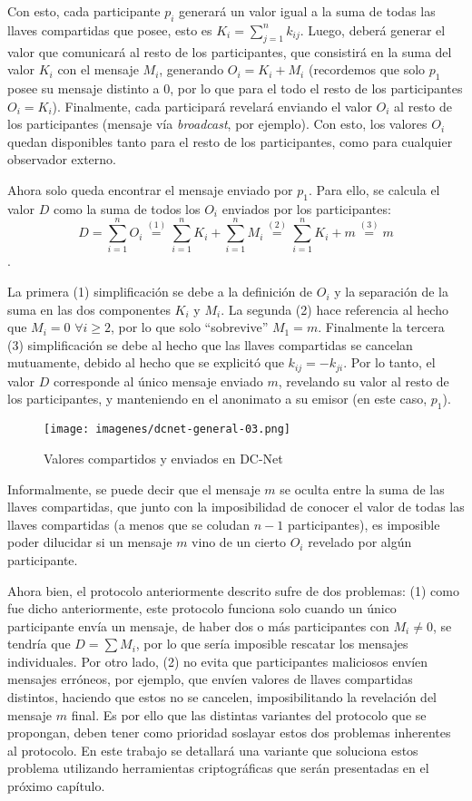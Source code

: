 Con esto, cada participante $p_i$ generará un valor igual a la suma de todas las llaves compartidas que posee, esto es $K_i = \sum_{j=1}^n k_{ij}$. Luego, deberá generar el valor que comunicará al resto de los participantes, que consistirá en la suma del valor $K_i$ con el mensaje $M_i$, generando $O_i = K_i + M_i$ (recordemos que solo $p_1$ posee su mensaje distinto a 0, por lo que para el todo el resto de los participantes $O_i = K_i$). Finalmente, cada participará revelará enviando el valor $O_i$ al resto de los participantes (mensaje vía \emph{broadcast}, por ejemplo). Con esto, los valores $O_i$ quedan disponibles tanto para el resto de los participantes, como para cualquier observador externo.

Ahora solo queda encontrar el mensaje enviado por $p_1$. Para ello, se calcula el valor $D$ como la suma de todos los $O_i$ enviados por los participantes: $$D = \sum_{i=1}^n O_i \overset{(1)}{=} \sum_{i=1}^n K_i + \sum_{i=1}^n M_i \overset{(2)}{=} \sum_{i=1}^n K_i + m \overset{(3)}{=} m$$.

La primera (1) simplificación se debe a la definición de $O_i$ y la separación de la suma en las dos componentes $K_i$ y $M_i$. La segunda (2) hace referencia al hecho que $M_i = 0$ $\forall i \geq 2$, por lo que solo ``sobrevive'' $M_1 = m$. Finalmente la tercera (3) simplificación se debe al hecho que las llaves compartidas se cancelan mutuamente, debido al hecho que se explicitó que $k_{ij} = -k_{ji}$. Por lo tanto, el valor $D$ corresponde al único mensaje enviado $m$, revelando su valor al resto de los participantes, y manteniendo en el anonimato a su emisor (en este caso, $p_1$).

\begin{figure}
  \centering
    \texttt{[image: imagenes/dcnet-general-03.png]}
  \caption{Valores compartidos y enviados en DC-Net}
\end{figure}

Informalmente, se puede decir que el mensaje $m$ se oculta entre la suma de las llaves compartidas, que junto con la imposibilidad de conocer el valor de todas las llaves compartidas (a menos que se coludan $n-1$ participantes), es imposible poder dilucidar si un mensaje $m$ vino de un cierto $O_i$ revelado por algún participante.

Ahora bien, el protocolo anteriormente descrito sufre de dos problemas: (1) como fue dicho anteriormente, este protocolo funciona solo cuando un único participante envía un mensaje, de haber dos o más participantes con $M_i \neq 0$, se tendría que $D = \sum M_i$, por lo que sería imposible rescatar los mensajes individuales. Por otro lado, (2) no evita que participantes maliciosos envíen mensajes erróneos, por ejemplo, que envíen valores de llaves compartidas distintos, haciendo que estos no se cancelen, imposibilitando la revelación del mensaje $m$ final. Es por ello que las distintas variantes del protocolo que se propongan, deben tener como prioridad soslayar estos dos problemas inherentes al protocolo. En este trabajo se detallará una variante que soluciona estos problema utilizando herramientas criptográficas que serán presentadas en el próximo capítulo.

